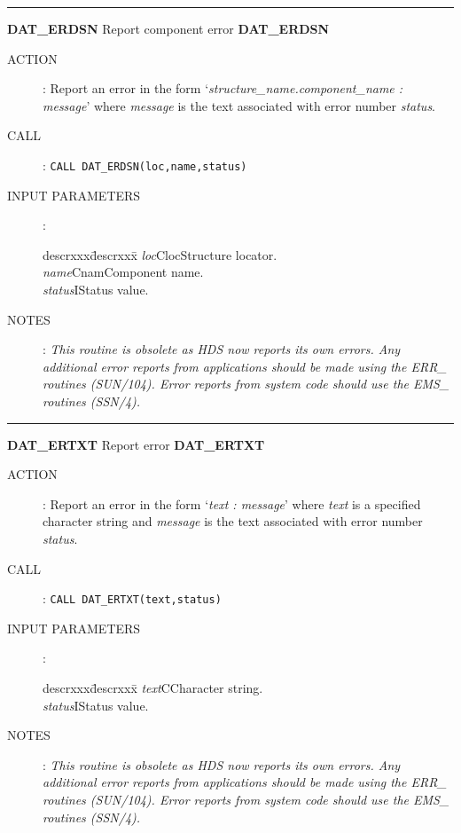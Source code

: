 \rule{\textwidth}{0.3mm}
{\Large {\bf DAT\_ERDSN} \hfill Report component error \hfill {\bf DAT\_ERDSN}}
\begin{description}
\item [ACTION]:
Report an error in the form `{\em structure\_name.component\_name : message}'
where {\em message} is the text associated with error number {\em status}.
\item [CALL]:
{\tt CALL DAT\_ERDSN(loc,name,status)}
\item [INPUT PARAMETERS]:
\begin{tabbing}
descrxxx\=descrxxx\=\kill
{\em loc}\>Cloc\>Structure locator.\\
{\em name}\>Cnam\>Component name.\\
{\em status}\>I\>Status value.
\end{tabbing}
\item [NOTES]:
{\em This routine is obsolete as HDS now reports its own errors. Any additional
error reports from applications should be made using the ERR\_ routines
(SUN/104). Error reports from system code should use the EMS\_ routines
(SSN/4).}
\end{description}
\goodbreak

\rule{\textwidth}{0.3mm}
{\Large {\bf DAT\_ERTXT} \hfill Report error \hfill {\bf DAT\_ERTXT}}
\begin{description}
\item [ACTION]:
Report an error in the form `{\em text : message}' where {\em text} is a
specified character string and {\em message} is the text associated with error
number {\em status}.
\item [CALL]:
{\tt CALL DAT\_ERTXT(text,status)}
\item [INPUT PARAMETERS]:
\begin{tabbing}
descrxxx\=descrxxx\=\kill
{\em text}\>C\>Character string.\\
{\em status}\>I\>Status value.
\end{tabbing}
\item [NOTES]:
{\em This routine is obsolete as HDS now reports its own errors. Any additional
error reports from applications should be made using the ERR\_ routines
(SUN/104). Error reports from system code should use the EMS\_ routines
(SSN/4).}
\end{description}
\goodbreak

